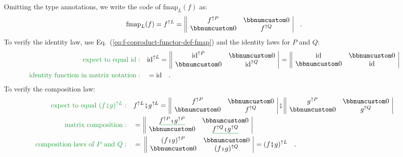 Omitting the type annotations, we write the code of $\text{fmap}_{L}(f)$
as:
\begin{equation}
\text{fmap}_{L}(f)=f^{\uparrow L}=\,\begin{array}{||cc|}
f^{\uparrow P} & \bbnum 0\\
\bbnum 0 & f^{\uparrow Q}
\end{array}\quad.\label{eq:f-coproduct-functor-def-fmap}
\end{equation}
To verify the identity law, use Eq.~(\ref{eq:f-coproduct-functor-def-fmap})
and the identity laws for $P$ and $Q$:
\begin{align*}
{\color{greenunder}\text{expect to equal }\text{id}:}\quad & \text{id}^{\uparrow L}=\,\begin{array}{||cc|}
\text{id}^{\uparrow P} & \bbnum 0\\
\bbnum 0 & \text{id}^{\uparrow Q}
\end{array}\,=\,\begin{array}{||cc|}
\text{id} & \bbnum 0\\
\bbnum 0 & \text{id}
\end{array}\\
{\color{greenunder}\text{identity function in matrix notation}:}\quad & =\text{id}\quad.
\end{align*}
To verify the composition law:
\begin{align*}
{\color{greenunder}\text{expect to equal }(f\bef g)^{\uparrow L}:}\quad & f^{\uparrow L}\bef g^{\uparrow L}=\,\begin{array}{||cc|}
f^{\uparrow P} & \bbnum 0\\
\bbnum 0 & f^{\uparrow Q}
\end{array}\,\bef\,\begin{array}{||cc|}
g^{\uparrow P} & \bbnum 0\\
\bbnum 0 & g^{\uparrow Q}
\end{array}\\
{\color{greenunder}\text{matrix composition}:}\quad & =\,\begin{array}{||cc|}
\gunderline{f^{\uparrow P}\bef g^{\uparrow P}} & \bbnum 0\\
\bbnum 0 & \gunderline{f^{\uparrow Q}\bef g^{\uparrow Q}}
\end{array}\\
{\color{greenunder}\text{composition laws of }P\text{ and }Q:}\quad & =\,\,\begin{array}{||cc|}
(f\bef g)^{\uparrow P} & \bbnum 0\\
\bbnum 0 & (f\bef g)^{\uparrow Q}
\end{array}\,=(f\bef g)^{\uparrow L}\quad.
\end{align*}

